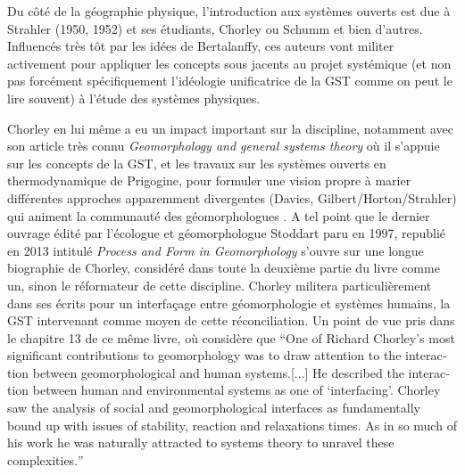 Du côté de la géographie physique, l'introduction aux systèmes ouverts est due à Strahler (1950, 1952) et ses étudiants, Chorley ou Schumm et bien d'autres. Influencés très tôt par les idées de Bertalanffy, ces auteurs vont militer activement pour appliquer les concepts sous jacents au projet systémique (et non pas forcément spécifiquement l'idéologie unificatrice de la GST comme on peut le lire souvent) à l'étude des systèmes physiques.

Chorley en lui même a eu un impact important sur la discipline, notamment avec son article très connu \textit{Geomorphology and general systems theory} \autocite{Chorley1962} où il s'appuie sur les concepts de la GST, et les travaux sur les systèmes ouverts en thermodynamique de Prigogine, pour formuler une vision propre à marier différentes approches apparemment divergentes (Davies, Gilbert/Horton/Strahler) qui animent la communauté des géomorphologues \autocite{Stoddart2013, Varenne2014}. A tel point que le dernier ouvrage édité par l'écologue et géomorphologue Stoddart paru en 1997, republié en 2013 intitulé \textit{Process and Form in Geomorphology} \autocite{Stoddart2013} s'ouvre sur une longue biographie de Chorley, considéré dans toute la deuxième partie du livre comme un, sinon le réformateur de cette discipline. Chorley militera particulièrement dans ses écrits pour un interfaçage entre géomorphologie et systèmes humains, la GST intervenant comme moyen de cette réconciliation. Un point de vue pris dans le chapitre 13 de ce même livre, où \textcite{Bennett2013} considère que \foreignquote{english}{One of Richard Chorley's most significant contributions to geomorphology was to draw attention to the interaction between geomorphological and human systems.[...] He described the interaction between human and environmental systems as one of \enquote{interfacing}. Chorley saw the analysis of social and geomorphological interfaces as fundamentally bound up with issues of stability, reaction and relaxations times. As in so much of his work he was naturally attracted to systems theory to unravel these complexities.}

